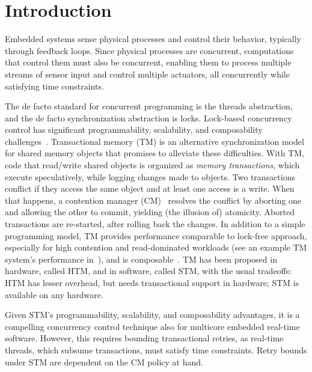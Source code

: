 \documentclass[letter]{sig-alternate}
\begin{document}
\section{Introduction}

\label{sec:intro}

Embedded systems sense physical processes and control their behavior, typically through feedback loops. Since physical processes are concurrent, computations that control them must also be concurrent, enabling them to process multiple streams of sensor input and control multiple actuators, all concurrently while satisfying time constraints. 

The de facto standard for concurrent programming is the threads abstraction, and the 
de facto synchronization abstraction is locks. Lock-based concurrency control has significant programmability, scalability, and composability challenges~\cite{Herlihy:2006:AMP:1146381.1146382}. Transactional memory (TM) is an alternative synchronization model for shared memory objects that promises to alleviate these difficulties. With TM, code that read/write shared objects is organized as \textit{memory transactions}, which execute speculatively, while logging changes made to objects. Two transactions conflict if they access the same object and at least one access is a write. When that happens, a contention manager (CM)~\cite{Guerraoui:2005:TTT:1073814.1073863} resolves the conflict by aborting one and allowing the other to commit, yielding (the illusion of) atomicity. Aborted transactions are re-started, after rolling back the changes. In addition to a simple programming model, TM provides performance comparable to lock-free approach, especially for high contention and read-dominated workloads (see an example TM system's performance in~\cite{Saha:2006:MHP:1122971.1123001}), and is composable~\cite{Harris:2005:CMT:1065944.1065952}. TM has been proposed in hardware, called HTM, and in software, called STM, with the usual tradeoffs: HTM has lesser overhead, but needs transactional support in hardware; STM is available on any hardware.

Given STM's programmability, scalability, and composability advantages, it is a compelling concurrency control technique also for multicore embedded real-time software. However, this requires  bounding transactional  retries, as real-time threads, which subsume transactions, must satisfy time constraints.  Retry bounds under STM are dependent on the CM policy at hand. 
\end{document}
